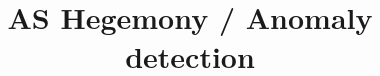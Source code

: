 \documentclass[sigconf]{acmart}
\begin{document}
\title{AS Hegemony / Anomaly detection }



\begin{abstract}
    
\end{abstract}

\maketitle










\end{document}
